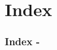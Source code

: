 \section*{Index}

\begin{frame}[t,allowframebreaks]
  \frametitle{Index -}
  \printindex
\end{frame}

